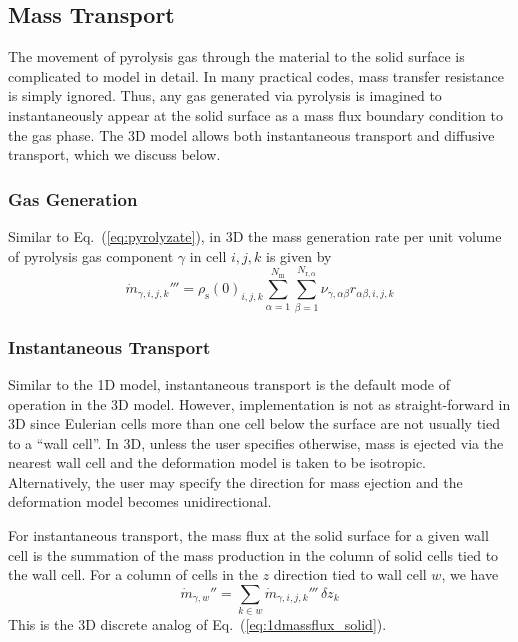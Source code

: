 \subsection{Mass Transport}
\label{sec:mass_transport}

The movement of pyrolysis gas through the material to the solid surface is complicated to model in detail.  In many practical codes, mass transfer resistance is simply ignored.  Thus, any gas generated via pyrolysis is imagined to instantaneously appear at the solid surface as a mass flux boundary condition to the gas phase.  The 3D model allows both instantaneous transport and diffusive transport, which we discuss below.

\subsubsection*{Gas Generation}
\label{eq:gas_generation}

Similar to Eq.~(\ref{eq:pyrolyzate}), in 3D the mass generation rate per unit volume of pyrolysis gas component $\gamma$ in cell $i,j,k$ is given by
\begin{equation}
\label{eq:massprod}
\dot{m}_{\gamma,i,j,k}''' = \rho_{\mathrm{s}}(0)_{i,j,k} \sum_{\alpha=1}^{N_{\mathrm{m}}} \sum_{\beta=1}^{N_{\mathrm{r},\alpha}} \nu_{\gamma,\alpha\beta} r_{\alpha\beta,i,j,k}
\end{equation}

\subsubsection*{Instantaneous Transport}
\label{sec:instantaneous_transport}

Similar to the 1D model, instantaneous transport is the default mode of operation in the 3D model.  However, implementation is not as straight-forward in 3D since Eulerian cells more than one cell below the surface are not usually tied to a ``wall cell''.  In 3D, unless the user specifies otherwise, mass is ejected via the nearest wall cell and the deformation model is taken to be isotropic.  Alternatively, the user may specify the direction for mass ejection and the deformation model becomes unidirectional.

For instantaneous transport, the mass flux at the solid surface for a given wall cell is the summation of the mass production in the column of solid cells tied to the wall cell.  For a column of cells in the $z$ direction tied to wall cell $w$, we have
\begin{equation}
\label{eq:mdotint}
\dot{m}_{\gamma,w}'' = \sum_{k \in w} \dot{m}_{\gamma,i,j,k}''' \,\delta z_k
\end{equation}
This is the 3D discrete analog of Eq.~(\ref{eq:1dmassflux_solid}).

